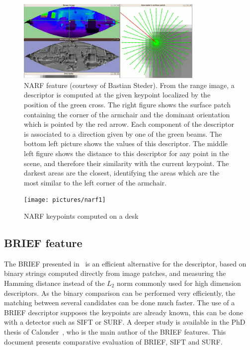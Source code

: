 \begin{figure}[H]
\centering
\includegraphics[width=0.8\textwidth]{figures/narf_descriptor_visualization}
\caption{NARF feature (courtesy of Bastian Steder). From the range image, a descriptor is computed at the given keypoint localized by the position of the green cross. The right figure shows the surface patch containing the corner of the armchair and the dominant orientation which is pointed by the red arrow. Each component of the descriptor is associated to a direction given by one of the green beams. The bottom left picture shows the values of this descriptor. The middle left figure shows the distance to this descriptor for any point in the scene, and therefore their similarity with the current keypoint. The darkest areas are the closest, identifying the areas which are the most similar to the left corner of the armchair.}
\end{figure}

\begin{figure}[H]
\centering
\texttt{[image: pictures/narf1]}
\caption{NARF keypoints computed on a desk}
\end{figure}

\subsection{BRIEF feature}

The \gls{BRIEF} presented in~\cite{Calonder10-brief} is an efficient alternative for the descriptor, based on binary strings computed directly from image patches, and measuring the Hamming distance instead of the $L_2$ norm commonly used for high dimension descriptors. As the binary comparison can be performed very efficiently, the matching between several candidates can be done much faster. The use of a \gls{BRIEF} descriptor supposes the keypoints are already known, this can be done with a detector such as \gls{SIFT} or \gls{SURF}. A deeper study is available in the PhD thesis of Calonder~\cite{Calonder10_PhD}, who is the main author of the \gls{BRIEF} features. This document presents comparative evaluation of \gls{BRIEF}, \gls{SIFT} and \gls{SURF}. 

